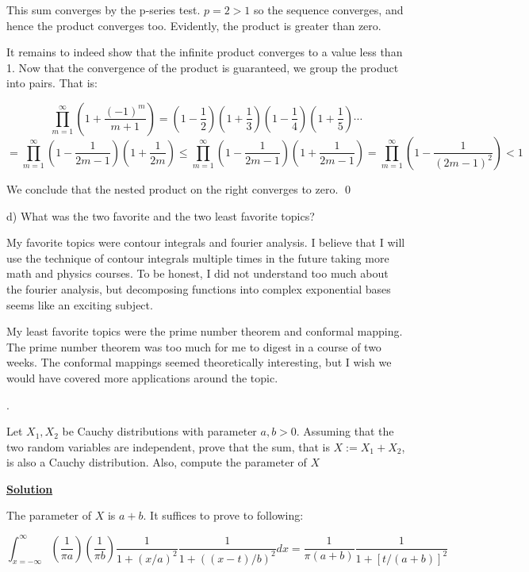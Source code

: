 \documentclass{article}
\newcommand{\new}[1]{
    \vspace{2mm}
    \noindent
    \textbf{
    \underline{#1}}
}
\newcounter{problemcnt}
\newcommand{\Problem}{{
    \vspace{5mm}
    \stepcounter{problemcnt}
    \noindent
    \arabic{problemcnt}. 
}
}
\begin{document}
This sum converges by the p-series test. $p = 2 > 1$ so the 
sequence converges, and hence the product converges too. 
Evidently, the product is greater than zero. 

It remains to indeed show that the infinite product converges to 
a value less than 1. Now that the convergence of the product is 
guaranteed, we group the product into pairs. That is:


\newcommand{\term}[1]{{
    \left(
        1 + \frac{1}{#1}
    \right)
}
}

\newcommand{\nterm}[1]{{
    \left(
        1 - \frac{1}{#1}
    \right)
}
}
\[
    \prod^\infty_{m = 1}\left(1 + \frac{(-1)^m}{m + 1}\right)
    =
    \nterm{2} \term{3} \nterm{4} \term{5} \cdots
\]
\[
    = 
    \prod^\infty_{m = 1}\nterm{2m - 1}\term{2m}
    \leq 
    \prod^\infty_{m = 1}\nterm{2m - 1}\term{2m - 1}
    = 
    \prod^\infty_{m = 1}\nterm{(2m-1)^2} < 1
\]

We conclude that the nested product on the right converges to zero. 
\qed

d) What was the two favorite and the two least favorite topics?

My favorite topics were contour integrals and fourier analysis. 
I believe that I will use the technique of contour integrals 
multiple times in the future taking more math and physics 
courses. To be honest, I did not understand too much about 
the fourier analysis, but decomposing functions into 
complex exponential bases seems like an exciting subject. 

My least favorite topics were the prime number theorem and 
conformal mapping. The prime number theorem was too much for me to digest 
in a course of two weeks. The conformal mappings seemed theoretically 
interesting, but I wish we would have covered more applications 
around the topic.

\newpage

\Problem 

Let $X_1, X_2$ be Cauchy distributions with parameter $a, b > 0$. 
Assuming that the two random variables are independent, prove that 
the sum, that is $X:=X_1+X_2$, is also a Cauchy distribution. 
Also, compute the parameter of $X$

\new{Solution}
The parameter of $X$ is $a + b$. It suffices to prove to following:

\[
    \int_{x = -\infty}^{\infty}
    \left( 
        \frac{1}{\pi a} 
        \right)
\left( 
        \frac{1}{\pi b} 
        \right)
        \frac{1}{1+(x/a)^2}
        \frac{1}{1+((x-t)/b)^2}dx
        =
        \frac{1}{\pi (a+b)}
        \frac{1}{1 + [t/(a+b)]^2}
\]
\end{document}
